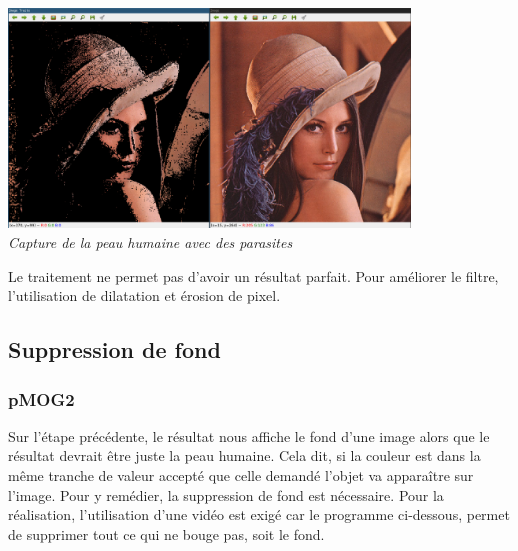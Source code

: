 \documentclass[12pt, french]{report}
\begin{document}
    \begin{center}
        \includegraphics[width=0.8\textwidth]{Images/CPH.png}\\
        \textit{Capture de la peau humaine avec des parasites}
    \end{center}

    Le traitement ne permet pas d'avoir un résultat parfait. Pour améliorer le filtre, l'utilisation de dilatation et érosion de pixel.\\
    
    \subsection{Suppression de fond}
    \subsubsection{pMOG2}
    
    Sur l'étape précédente, le résultat nous affiche le fond d'une image alors que le résultat devrait être juste la peau humaine. Cela dit, si la couleur est dans la même tranche de valeur accepté que celle demandé l'objet va apparaître sur l'image. 
    Pour y remédier, la suppression de fond est nécessaire. Pour la réalisation, l'utilisation d'une vidéo est exigé car le programme ci-dessous, permet de supprimer tout ce qui ne bouge pas, soit le fond. 
    
\end{document}
